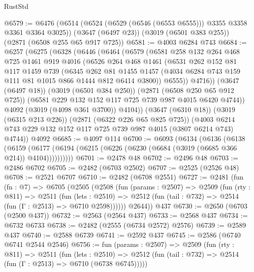 \begin{lexlean}{RustStd}
\begin{coremodule}
@6579 := @6476
    (@6514 (@6524 (@6529 (@6546 (@6553 @6555))) @3355 @3358 @3361 @3364 @3025))
    (@3647 (@6497 @23))
    (@3019 (@6501 @383 @255))
    (@2871 (@6508 @255 @65 @917 @725))
@6581 := @4003 @6284 @743
@6684 := @6257
    (@6275
      (@6328
        (@6446
          (@6464
            (@6579
              (@6581
                @258
                @132
                @264
                @468
                @725
                @1461
                @919
                @4016
                (@6526
                  @264
                  @468
                  @1461
                  (@6531
                    @262
                    @152
                    @81
                    @117
                    @1459
                    @739
                    (@6345
                      @262
                      @81
                      @1455
                      @1457
                      (@4034 @6284 @743 @159 @111 @81 @1015 @866 @1444 @812 @6414 @3800))
                    @6555))
                @4716))
            (@3647 (@6497 @18))
            (@3019 (@6501 @384 @250))
            (@2871 (@6508 @250 @65 @912 @725))
            (@6581 @229 @132 @152 @117 @725 @739 @987 @4015 @6420 @4744))
          @4092
          (@3019 (@4098 @361 @3700))
          @4104))
      (@3647 (@6310 @18))
      (@3019 (@6315 @213 @226))
      (@2871 (@6322 @226 @65 @825 @725))
      (@4003 @6214 @743 @229 @132 @152 @117 @725 @739 @987 @4015 (@3807 @6214 @743) @4744))
    @4092
@6685 := @4097 @114
@6700 := @6093
    (@6134
      (@6136
        (@6138
          (@6159 (@6177 (@6194 (@6215 (@6226 (@6230 (@6684 (@3019 (@6685 @366 @214)) @4104))))))))))
@6701 := @2478 @48
@6702 := @2496 @48
@6703 := @2486 @6702
@6705 := @2482 (@6703 @2502)
@6707 := @2525 (@2526 @48)
@6708 := @2521 @6707
@6710 := @2482 (@6708 @2551)
@6727 := @2481
    (fun (fn : @7) =>
    @6705
      (@2505
        (@2508
          (fun (params : @2507) =>
          @2509
            (fun (rty : @811) =>
            @2511
              (fun (lets : @2510) =>
              @2512 (fun (tail : @732) => @2514 (fun (Γ : @2513) => @6710 @2598))))))
        @2644))
    @437
@6730 := @2650 (@6703 (@2500 @437))
@6732 := @2563 (@2564 @437)
@6733 := @2568 @437
@6734 := @6732 @6733
@6738 := @2482 (@2555 (@6734 @2572) @2576)
@6739 := @2589 @437
@6740 := @2588 @6739
@6741 := @2592 @437
@6745 := @2586 (@6740 @6741 @2544 @2546)
@6756 := fun (params : @2507) =>
  @2509
    (fun (rty : @811) =>
    @2511
      (fun (lets : @2510) =>
      @2512 (fun (tail : @732) => @2514 (fun (Γ : @2513) => @6710 (@6738 @6745)))))

\end{coremodule}
\end{lexlean}

